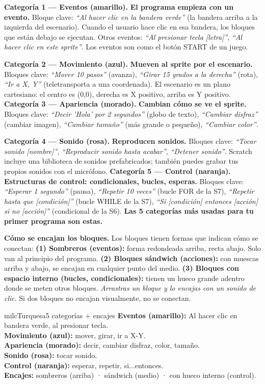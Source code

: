 \documentclass[11pt,letterpaper]{article}
\newcommand{\milcpaso}[3]{%
\Needspace{4\baselineskip}%
\begin{tcolorbox}[enhanced,colback=white,colframe=milcLinea,arc=1.5mm,boxrule=.9pt,
  left=14mm,right=4mm,top=3mm,bottom=3mm,before skip=4pt,after skip=4pt,
  fontupper=\RaggedRight,
  overlay={\node[anchor=north west,circle,fill=#2,text=white,inner sep=0pt,
    minimum size=7.4mm,font=\sffamily\bfseries\small]
    at ([xshift=3.6mm,yshift=-3.2mm]frame.north west) {#1};}]
#3
\end{tcolorbox}}
\begin{document}
\milcpaso{1}{milcTurquesa}{\textbf{Categoría 1 --- Eventos (amarillo).} \textbf{El programa empieza con un evento.} Bloque clave: \emph{``Al hacer clic en la bandera verde''} (la bandera arriba a la izquierda del escenario). Cuando el usuario hace clic en esa bandera, los bloques que están debajo se ejecutan. Otros eventos: \emph{``Al presionar tecla [letra]''}, \emph{``Al hacer clic en este sprite''}. Los eventos son como el botón START de un juego.}
\milcpaso{2}{milcTurquesa}{\textbf{Categoría 2 --- Movimiento (azul).} \textbf{Mueven al sprite por el escenario.} Bloques clave: \emph{``Mover 10 pasos''} (avanza), \emph{``Girar 15 grados a la derecha''} (rota), \emph{``Ir a X, Y''} (teletransporta a una coordenada). El escenario es un plano cartesiano: el centro es (0,0), derecha es X positivo, arriba es Y positivo. \textbf{Categoría 3 --- Apariencia (morado).} \textbf{Cambian cómo se ve el sprite.} Bloques clave: \emph{``Decir 'Hola' por 2 segundos''} (globo de texto), \emph{``Cambiar disfraz''} (cambiar imagen), \emph{``Cambiar tamaño''} (más grande o pequeño), \emph{``Cambiar color''}.}
\milcpaso{3}{milcTurquesa}{\textbf{Categoría 4 --- Sonido (rosa).} \textbf{Reproducen sonidos.} Bloques clave: \emph{``Tocar sonido [nombre]''}, \emph{``Reproducir sonido hasta acabar''}, \emph{``Detener sonido''}. Scratch incluye una biblioteca de sonidos prefabricados; también puedes grabar tus propios sonidos con el micrófono. \textbf{Categoría 5 --- Control (naranja).} \textbf{Estructuras de control: condicionales, bucles, esperas.} Bloques clave: \emph{``Esperar 1 segundo''} (pausa), \emph{``Repetir 10 veces''} (bucle FOR de la S7), \emph{``Repetir hasta que [condición]''} (bucle WHILE de la S7), \emph{``Si [condición] entonces [acción] si no [acción]''} (condicional de la S6). \textbf{Las 5 categorías más usadas para tu primer programa son estas.}}
\milcpaso{4}{milcTurquesa}{\textbf{Cómo se encajan los bloques.} Los bloques tienen formas que indican cómo se conectan: \textbf{(1) Sombreros (eventos):} forma redondeada arriba, recta abajo. Solo van al principio del programa. \textbf{(2) Bloques sándwich (acciones):} con muescas arriba y abajo, se encajan en cualquier punto del medio. \textbf{(3) Bloques con espacio interno (bucles, condicionales):} tienen un hueco grande adentro donde se meten otros bloques. \emph{Arrastras un bloque y lo encajas con un sonido de clic}. Si dos bloques no encajan visualmente, no se conectan.}

\begin{drawbox}{milcTurquesa}{5 categorías + encajes}
\textbf{Eventos (amarillo):} Al hacer clic en bandera verde, al presionar tecla. \\[1mm]
\textbf{Movimiento (azul):} mover, girar, ir a X-Y. \\[1mm]
\textbf{Apariencia (morado):} decir, cambiar disfraz, color, tamaño. \\[1mm]
\textbf{Sonido (rosa):} tocar sonido. \\[1mm]
\textbf{Control (naranja):} esperar, repetir, si...entonces. \\[1mm]
\textbf{Encajes:} sombreros (arriba) · sándwich (medio) · con hueco interno (control).
\end{drawbox}
\end{document}
